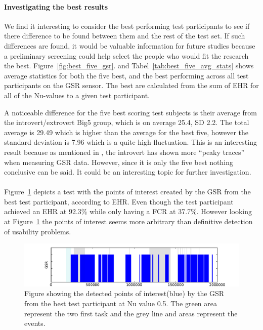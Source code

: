\paragraph{Investigating the best results}
We find it interesting to consider the best performing test participants to see if there difference to be found between them and the rest of the test set. 
If such differences are found, it would be valuable information for future studies because a preliminary screening could help select the people who would fit the research the best.
Figure~\ref{fig:best_five_gsr}. and Tabel~\ref{tab:best_five_avg_stats} shows average statistics for both the five best, and
the best performing across all test participants on the GSR sensor. 
The best are calculated from the sum of EHR for all of the Nu-values to a given test participant.


A noticeable difference for the five best scoring test subjects is their average from the introvert/extrovert Big5 group, which is on average 25.4, SD 2.2.
The total average is 29.49 which is higher than the average for the best five, however the standard deviation is 7.96 which is a quite high fluctuation. 
This is an interesting result because as mentioned in \cite{extrovsintro}, the introvert has shown more ``peaky traces'' when measuring GSR data.
However, since it is only the five best nothing conclusive can be said. 
It could be an interesting topic for further investigation.\\\\
Figure~\ref{[Fig] best result} depicts a test with the points of interest created by the GSR from the best test participant, according to EHR.
Even though the test participant achieved an EHR at 92.3\%  while only having a FCR at 37.7\%. However looking at Figure~\ref{[Fig] best result} the points of interest seems more arbitrary than definitive detection of usability problems.
    \begin{figure}[H]
    \begin{minipage}[t]{0.5\textwidth}
        \includegraphics[width=\linewidth,keepaspectratio=true]{graphics/graphs/events/johnny-nu050-29-short-sensors.pdf}
        \caption{Figure showing the detected points of interest(blue) by the GSR from the best test participant at Nu value 0.5. The green area represent the two first task and the grey line and areas represent the events.}
        \label{[Fig] best result}
    \end{minipage}
    \end{figure}
